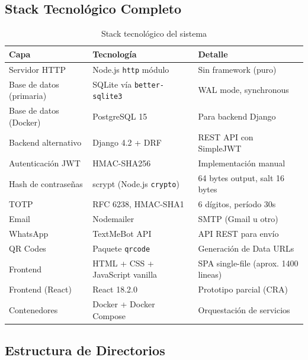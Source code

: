\documentclass[12pt,a4paper,openany]{article}
\begin{document}
\subsection{Stack Tecnológico Completo}

\begin{table}[H]
\centering
\caption{Stack tecnológico del sistema}
\begin{tabular}{@{}lll@{}}
\toprule
\textbf{Capa} & \textbf{Tecnología} & \textbf{Detalle} \\
\midrule
Servidor HTTP & Node.js \texttt{http} módulo & Sin framework (puro) \\
Base de datos (primaria) & SQLite vía \texttt{better-sqlite3} & WAL mode, synchronous \\
Base de datos (Docker) & PostgreSQL 15 & Para backend Django \\
Backend alternativo & Django 4.2 + DRF & REST API con SimpleJWT \\
Autenticación JWT & HMAC-SHA256 & Implementación manual \\
Hash de contraseñas & scrypt (Node.js \texttt{crypto}) & 64 bytes output, salt 16 bytes \\
TOTP & RFC 6238, HMAC-SHA1 & 6 dígitos, período 30s \\
Email & Nodemailer & SMTP (Gmail u otro) \\
WhatsApp & TextMeBot API & API REST para envío \\
QR Codes & Paquete \texttt{qrcode} & Generación de Data URLs \\
Frontend & HTML + CSS + JavaScript vanilla & SPA single-file (aprox. 1400 lineas) \\
Frontend (React) & React 18.2.0 & Prototipo parcial (CRA) \\
Contenedores & Docker + Docker Compose & Orquestación de servicios \\
\bottomrule
\end{tabular}
\end{table}

\subsection{Estructura de Directorios}
\end{document}
